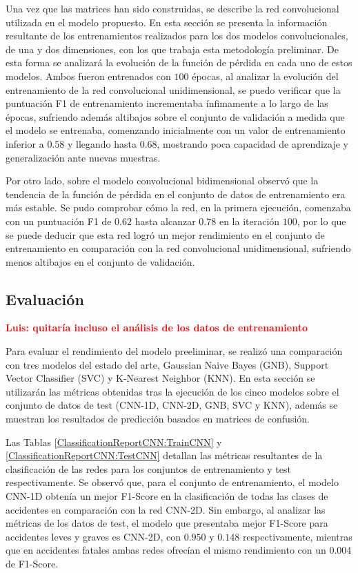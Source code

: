 \documentclass{uathesis-es}
\begin{document}
{		Una vez que las matrices han sido construidas, se describe la red convolucional utilizada en el modelo propuesto. En esta sección se presenta la información resultante de los entrenamientos realizados para los dos modelos convolucionales, de una y dos dimensiones, con los que trabaja esta metodología preliminar. De esta forma se analizará la evolución de la función de pérdida en cada uno de estos modelos. Ambos fueron entrenados con $100$ épocas, al analizar la evolución del entrenamiento de la red convolucional unidimensional, se puedo verificar que la puntuación F1 de entrenamiento incrementaba ínfimamente a lo largo de las épocas, sufriendo además altibajos sobre el conjunto de validación a medida que el modelo se entrenaba, comenzando inicialmente con un valor de entrenamiento inferior a $0.58$ y llegando hasta $0.68$, mostrando poca capacidad de aprendizaje y generalización ante nuevas muestras.
		
		Por otro lado, sobre el modelo convolucional bidimensional observó que la tendencia de la función de pérdida en el conjunto de datos de entrenamiento era más estable. Se pudo comprobar cómo la red, en la primera ejecución, comenzaba con un puntuación F1 de $0.62$ hasta alcanzar $0.78$ en la iteración $100$, por lo que se puede deducir que esta red logró un mejor rendimiento en el conjunto de entrenamiento en comparación con la red convolucional unidimensional, sufriendo menos altibajos en el conjunto de validación.
		
		
		\subsection*{Evaluación}
		
		\textcolor{red}{\textbf{Luis: quitaría incluso el análisis de los datos de entrenamiento}}
		
		Para evaluar el rendimiento del modelo preeliminar, se realizó una comparación con tres modelos del estado del arte, Gaussian Naive Bayes (GNB), Support Vector Classifier (SVC) y K-Nearest Neighbor (KNN). En esta sección se utilizarán las métricas obtenidas tras la ejecución de los cinco modelos sobre el conjunto de datos de test (CNN-1D, CNN-2D, GNB, SVC y KNN), además se muestran los resultados de predicción basados en matrices de confusión.
		
		Las Tablas \ref{ClassificationReportCNN:TrainCNN} y \ref{ClassificationReportCNN:TestCNN} detallan las métricas resultantes de la clasificación de las redes para los conjuntos de entrenamiento y test respectivamente. Se observó que, para el conjunto de entrenamiento, el modelo CNN-1D obtenía un mejor F1-Score en la clasificación de todas las clases de accidentes en comparación con la red CNN-2D. Sin embargo, al analizar las métricas de los datos de test, el modelo que presentaba mejor F1-Score para accidentes leves y graves es CNN-2D, con $0.950$ y $0.148$ respectivamente, mientras que en accidentes fatales ambas redes ofrecían el mismo rendimiento con un $0.004$ de F1-Score.
		
}
\end{document}
